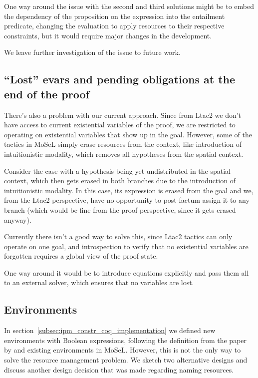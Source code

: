 One way around the issue with the second and third solutions might be to embed the dependency of the proposition on the expression into the entailment predicate, changing the evaluation to apply resources to their respective constraints, but it would require major changes in the development.

We leave further investigation of the issue to future work.


\subsection{``Lost'' evars and pending obligations at the end of the proof}
\label{subsec:hanging-obligations}

There's also a problem with our current approach.
Since from Ltac2 we don't have access to current existential variables of the proof, we are restricted to operating on existential variables that show up in the goal.
However, some of the tactics in MoSeL simply erase resources from the context, like introduction of intuitionistic modality, which removes all hypotheses from the spatial context.

Consider the case with a hypothesis being yet undistributed in the spatial context, which then gets erased in both branches due to the introduction of intuitionistic modality.
In this case, its expression is erased from the goal and we, from the Ltac2 perspective, have no opportunity to post-factum assign it to any branch (which would be fine from the proof perspective, since it gets erased anyway).

Currently there isn't a good way to solve this, since Ltac2 tactics can only operate on one goal, and introspection to verify that no existential variables are forgotten requires a global view of the proof state.

One way around it would be to introduce equations explicitly and pass them all to an external solver, which ensures that no variables are lost.

\subsection{Environments}
\label{subsec:environments}

In section~\ref{subsec:ipm_constr_coq_implementation} we defined new environments with Boolean expressions, following the definition from the paper by \citet{harlandResourceDistributionBooleanConstraints2003} and existing environments in MoSeL.
However, this is not the only way to solve the resource management problem.
We sketch two alternative designs and discuss another design decision that was made regarding naming resources.

